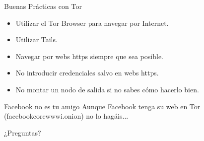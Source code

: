 \documentclass[10pt]{beamer}
\begin{document}
\begin{frame}{Buenas Prácticas con Tor}
	\begin{itemize}
		\item<1-> Utilizar el Tor Browser para navegar por Internet.\pause
		\item<2-> Utilizar Tails.\pause
		\item<3-> Navegar por webs https siempre que sea posible.\pause
		\item<4-> No introducir credenciales salvo en webs https.\pause
		\item<5-> No montar un nodo de salida si no sabes cómo hacerlo bien.\pause
	\end{itemize}
	\begin{alertblock}{Facebook no es tu amigo}
		Aunque Facebook tenga su web en Tor (facebookcorewwwi.onion) no lo hagáis...
	\end{alertblock}
\end{frame}

\begin{frame}[standout]
	¿Preguntas?
\end{frame}
	
\end{document}
